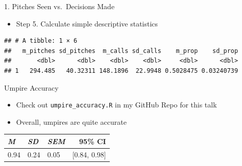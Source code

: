 \documentclass[14pt,ignorenonframetext,aspectratio = 1610]{beamer}
\newenvironment{Shaded}{\begin{snugshade}}{\end{snugshade}}
\newcommand{\KeywordTok}[1]{\textcolor[rgb]{0.13,0.29,0.53}{\textbf{{#1}}}}
\newcommand{\DataTypeTok}[1]{\textcolor[rgb]{0.13,0.29,0.53}{{#1}}}
\newcommand{\StringTok}[1]{\textcolor[rgb]{0.31,0.60,0.02}{{#1}}}
\newcommand{\NormalTok}[1]{{#1}}
\providecommand{\tightlist}{%
\setlength{\itemsep}{0pt}\setlength{\parskip}{0pt}}
\begin{document}
\begin{frame}[fragile]{1. Pitches Seen vs.~Decisions Made}

\begin{itemize}
\tightlist
\item
  Step 5. Calculate simple descriptive statistics
\end{itemize}

\footnotesize

\begin{Shaded}
\end{Shaded}

\begin{verbatim}
## # A tibble: 1 × 6
##   m_pitches sd_pitches  m_calls sd_calls    m_prop    sd_prop
##       <dbl>      <dbl>    <dbl>    <dbl>     <dbl>      <dbl>
## 1   294.485   40.32311 148.1896  22.9948 0.5028475 0.03240739
\end{verbatim}

\end{frame}

\begin{frame}[fragile]{Umpire Accuracy}

\begin{itemize}
\tightlist
\item
  Check out \texttt{umpire\_accuracy.R} in my GitHub Repo for this talk
\item
  Overall, umpires are quite accurate
\end{itemize}

\begin{table}[ht]
\centering
\begin{tabular}{lllr}
\hline
\em{M} & \em{SD} & \em{SEM} & 95\% CI \\
\hline
0.94 & 0.24 & 0.05 & [0.84, 0.98] \\
\hline
\end{tabular}
\end{table}

\end{frame}
\end{document}
